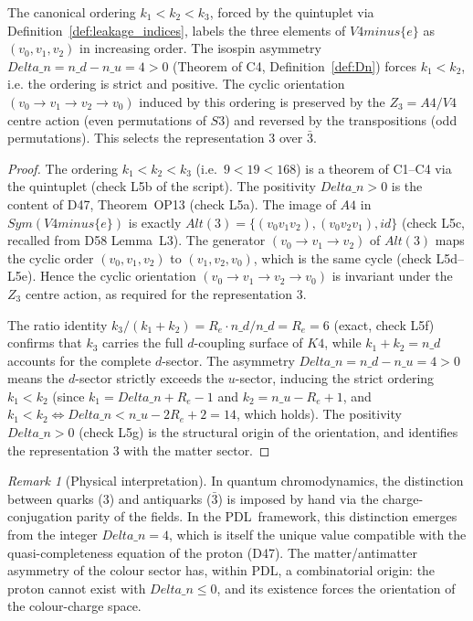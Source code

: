 \documentclass[11pt,a4paper]{article}
\def\Vfour{V4}%
\def\Afour{A4}%
\def\Sthree{S3}%
\def\Kfour{K4}%
\def\Re{Re}%
\def\PDL{PDL}%
\def\setminus{ minus }%
\def\Sym{Sym}%
\def\mathbb#1{#1}%
\def\mathrm#1{#1}%
\def\mathbf#1{#1}%
\def\textsc#1{#1}%
\def\nuu{n\_u}%
\def\ndd{n\_d}%
\def\Dn{Delta\_n}%
\newenvironment{lemmabox}[1][]{%
  \begin{tcolorbox}[lemmastyle,title={Lemma\ifx\relax#1\relax\else: #1\fi}]}{\end{tcolorbox}}
\theoremstyle{plain}
\theoremstyle{definition}
\theoremstyle{remark}
\newtheorem{remark}[theorem]{Remark}
\newcommand{\PDL}{\textsc{PDL}}
\newcommand{\Kfour}{K_4}
\newcommand{\Afour}{A_4}
\newcommand{\Vfour}{V_4}
\newcommand{\Sthree}{S_3}
\newcommand{\Sym}{\mathrm{Sym}}
\renewcommand{\Re}{R_e}
\newcommand{\nuu}{n_u}
\newcommand{\ndd}{n_d}
\newcommand{\Dn}{\Delta n}
\newcommand{\kone}{k_1}
\newcommand{\ktwo}{k_2}
\newcommand{\kthree}{k_3}
\begin{document}
\begin{lemmabox}[L5 --- Canonical orientation from the isospin asymmetry]
\label{lem:L5}
The canonical ordering $\kone < \ktwo < \kthree$, forced by the quintuplet via Definition~\ref{def:leakage_indices}, labels the three elements of $\Vfour \setminus \{e\}$ as $(v_0, v_1, v_2)$ in increasing order. The isospin asymmetry $\Dn = \ndd - \nuu = 4 > 0$ (Theorem of C4, Definition~\ref{def:Dn}) forces $\kone < \ktwo$, i.e. the ordering is strict and positive. The cyclic orientation $(v_0 \to v_1 \to v_2 \to v_0)$ induced by this ordering is preserved by the $\mathbb{Z}_3 = \Afour/\Vfour$ centre action (even permutations of $\Sthree$) and reversed by the transpositions (odd permutations). This selects the representation $\mathbf{3}$ over $\bar{\mathbf{3}}$.
\end{lemmabox}

\begin{proof}
The ordering $\kone < \ktwo < \kthree$ (i.e.\ $9 < 19 < 168$) is a theorem of C1--C4 via the quintuplet (check L5b of the script). The positivity $\Dn > 0$ is the content of D47, Theorem~OP13 (check L5a). The image of $\Afour$ in $\Sym(\Vfour\setminus\{e\})$ is exactly $\mathrm{Alt}(3) = \{(v_0v_1v_2), (v_0v_2v_1), \mathrm{id}\}$ (check L5c, recalled from D58 Lemma~L3). The generator $(v_0 \to v_1 \to v_2)$ of $\mathrm{Alt}(3)$ maps the cyclic order $(v_0, v_1, v_2)$ to $(v_1, v_2, v_0)$, which is the same cycle (check L5d--L5e). Hence the cyclic orientation $(v_0 \to v_1 \to v_2 \to v_0)$ is invariant under the $\mathbb{Z}_3$ centre action, as required for the representation $\mathbf{3}$.

The ratio identity $\kthree/(\kone+\ktwo) = \Re \cdot \ndd/\ndd = \Re = 6$ (exact, check L5f) confirms that $\kthree$ carries the full $d$-coupling surface of $\Kfour$, while $\kone + \ktwo = \ndd$ accounts for the complete $d$-sector. The asymmetry $\Dn = \ndd - \nuu = 4 > 0$ means the $d$-sector strictly exceeds the $u$-sector, inducing the strict ordering $\kone < \ktwo$ (since $\kone = \Dn + \Re - 1$ and $\ktwo = \nuu - \Re + 1$, and $\kone < \ktwo \Leftrightarrow \Dn < \nuu - 2\Re + 2 = 14$, which holds). The positivity $\Dn > 0$ (check L5g) is the structural origin of the orientation, and identifies the representation $\mathbf{3}$ with the matter sector.
\end{proof}

\begin{remark}[Physical interpretation]
In quantum chromodynamics, the distinction between quarks ($\mathbf{3}$) and antiquarks ($\bar{\mathbf{3}}$) is imposed by hand via the charge-conjugation parity of the fields. In the \PDL\ framework, this distinction emerges from the integer $\Dn = 4$, which is itself the unique value compatible with the quasi-completeness equation of the proton (D47). The matter/antimatter asymmetry of the colour sector has, within PDL, a combinatorial origin: the proton cannot exist with $\Dn \leq 0$, and its existence forces the orientation of the colour-charge space.
\end{remark}
\end{document}
